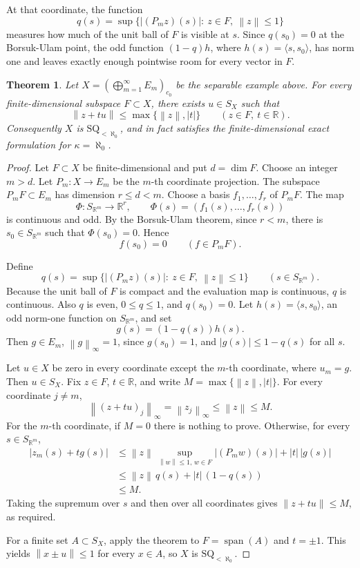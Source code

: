 \documentclass[11pt]{article}
\newtheorem{theorem}{Theorem}
\newcommand{\R}{\mathbb{R}}
\newcommand{\norm}[1]{\left\lVert #1 \right\rVert}
\begin{document}
At that coordinate, the function
\[
  q(s)=\sup\{|(P_m z)(s)|:\ z\in F,\ \norm{z}\leq 1\}
\]
measures how much of the unit ball of \(F\) is visible at \(s\).  Since
\(q(s_0)=0\) at the Borsuk-Ulam point, the odd function
\((1-q)h\), where \(h(s)=\langle s,s_0\rangle\), has norm one and leaves
exactly enough pointwise room for every vector in \(F\).

\begin{theorem}
Let \(X=(\bigoplus_{m=1}^{\infty}E_m)_{c_0}\) be the separable example above.
For every finite-dimensional subspace \(F\subset X\), there exists \(u\in S_X\)
such that
\[
  \norm{z+t u}\leq \max\{\norm{z}, |t|\}
  \qquad (z\in F,\ t\in\R).
\]
Consequently \(X\) is \(\mathrm{SQ}_{<\aleph_0}\), and in fact satisfies the
finite-dimensional exact formulation for \(\kappa=\aleph_0\).
\end{theorem}

\begin{proof}
Let \(F\subset X\) be finite-dimensional and put \(d=\dim F\).  Choose an
integer \(m>d\).  Let \(P_m:X\to E_m\) be the \(m\)-th coordinate projection.
The subspace \(P_mF\subset E_m\) has dimension \(r\leq d<m\).  Choose a basis
\(f_1,\ldots,f_r\) of \(P_mF\).  The map
\[
  \Phi:S_{\R^m}\to \R^r,\qquad
  \Phi(s)=(f_1(s),\ldots,f_r(s))
\]
is continuous and odd.  By the Borsuk-Ulam theorem, since \(r<m\), there is
\(s_0\in S_{\R^m}\) such that \(\Phi(s_0)=0\).  Hence
\[
  f(s_0)=0 \qquad (f\in P_mF).
\]

Define
\[
  q(s)=\sup\{|(P_m z)(s)|:\ z\in F,\ \norm{z}\leq 1\}
  \qquad (s\in S_{\R^m}).
\]
Because the unit ball of \(F\) is compact and the evaluation map is continuous,
\(q\) is continuous.  Also \(q\) is even, \(0\le q\le 1\), and \(q(s_0)=0\).
Let \(h(s)=\langle s,s_0\rangle\), an odd norm-one function on \(S_{\R^m}\),
and set
\[
  g(s)=(1-q(s))h(s).
\]
Then \(g\in E_m\), \(\norm{g}_\infty=1\), since \(g(s_0)=1\), and
\(|g(s)|\leq 1-q(s)\) for all \(s\).

Let \(u\in X\) be zero in every coordinate except the \(m\)-th coordinate,
where \(u_m=g\).  Then \(u\in S_X\).  Fix \(z\in F\), \(t\in\R\), and write
\(M=\max\{\norm{z},|t|\}\).  For every coordinate \(j\neq m\),
\[
  \norm{(z+t u)_j}_\infty=\norm{z_j}_\infty\leq \norm{z}\leq M.
\]
For the \(m\)-th coordinate, if \(M=0\) there is nothing to prove.  Otherwise,
for every \(s\in S_{\R^m}\),
\[
\begin{aligned}
  |z_m(s)+t g(s)|
  &\leq \norm{z}\,
     \sup_{\norm{w}\leq 1,\,w\in F}|(P_m w)(s)|
     + |t|\, |g(s)| \\
  &\leq \norm{z}\,q(s)+|t|\,(1-q(s))\\
  &\leq M.
\end{aligned}
\]
Taking the supremum over \(s\) and then over all coordinates gives
\(\norm{z+t u}\leq M\), as required.

For a finite set \(A\subset S_X\), apply the theorem to
\(F=\operatorname{span}(A)\) and \(t=\pm1\).  This yields
\(\norm{x\pm u}\leq1\) for every \(x\in A\), so \(X\) is
\(\mathrm{SQ}_{<\aleph_0}\).
\end{proof}
\end{document}
